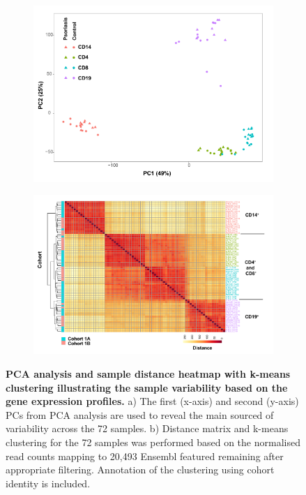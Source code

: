 \begin{figure}[htbp]
\centering
\begin{subfigure}{0.5\textwidth}
\centering
\includegraphics[width=\textwidth]{./Results2/pdfs/PS_CTL_all_samples_varied_PCA1and2_plot}
\caption{\textbf{}}
\end{subfigure}
\begin{subfigure}{0.5\textwidth}
\centering
\includegraphics[width=\textwidth]{./Results2/pdfs/PS_CTL_all_samples_heatmap_including_batch}
\caption{\textbf{}}
\end{subfigure}
\caption[PCA analysis and  sample distance heatmap with k-means clustering illustrating the sample variability based on the gene expression profiles.]{\textbf{PCA analysis and  sample distance heatmap with k-means clustering illustrating the sample variability based on the gene expression profiles.} a) The first (x-axis) and second (y-axis) PCs from PCA analysis are used to reveal the main sourced of variability across the 72 samples. b) Distance matrix and k-means clustering for the 72 samples was performed based on the normalised read counts mapping to 20,493 Ensembl featured remaining after appropriate filtering. Annotation of the clustering using cohort identity is included.}
\label{figure:RNAseq_PCA_and_heat_map}
\end{figure}


